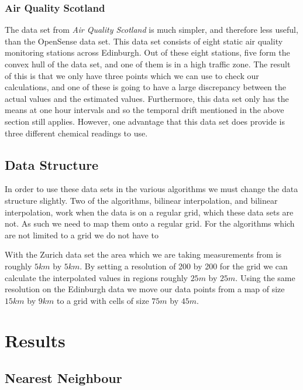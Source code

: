 			\subsubsection{Air Quality Scotland}\label{prediction_evaluation_methodology_data_sets_air_quality_scotland}

				The data set from \emph{Air Quality Scotland} is much simpler, and therefore less useful, than the OpenSense data set. This data set consists of eight static air quality monitoring stations across Edinburgh. Out of these eight stations, five form the convex hull of the data set, and one of them is in a high traffic zone. The result of this is that we only have three points which we can use to check our calculations, and one of these is going to have a large discrepancy between the actual values and the estimated values. Furthermore, this data set only has the means at one hour intervals and so the temporal drift mentioned in the above section still applies. However, one advantage that this data set does provide is three different chemical readings to use. 

		\subsection{Data Structure}\label{prediction_evaluation_methodology_data_structure}
			
			In order to use these data sets in the various algorithms we must change the data structure slightly. Two of the algorithms, bilinear interpolation, and bilinear interpolation, work when the data is on a regular grid, which these data sets are not. As such we need to map them onto a regular grid. For the algorithms which are not limited to a grid we do not have to

			With the Zurich data set the area which we are taking measurements from is roughly $5km$ by $5km$. By setting a resolution of 200 by 200 for the grid we can calculate the interpolated values in regions roughly $25m$ by $25m$. Using the same resolution on the Edinburgh data we move our data points from a map of size $15km$ by $9km$ to a grid with cells of size $75m$ by $45m$. 


		

    \section{Results}\label{prediction_evaluation_results}

        \subsection{Nearest Neighbour}\label{prediction_evaluation_results_nearest_neighbour}



